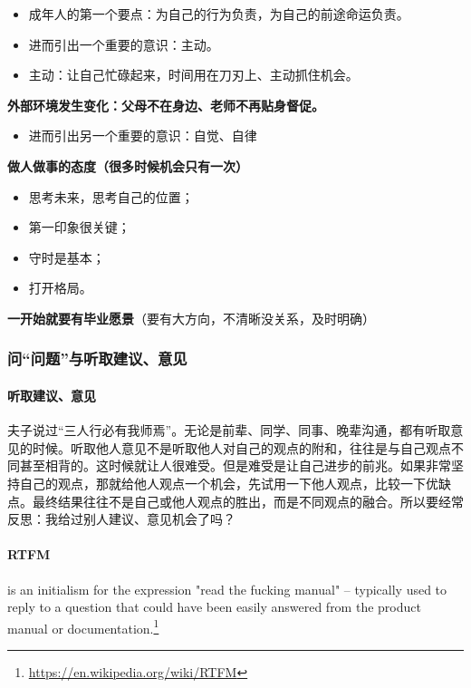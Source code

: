 \documentclass[cn,hazy,blue,14pt,screen]{elegantnote}
\begin{document}
\begin{itemize}
\item  成年人的第一个要点：为自己的行为负责，为自己的前途命运负责。

\item  进而引出一个重要的意识：主动。

\item  主动：让自己忙碌起来，时间用在刀刃上、主动抓住机会。
\end{itemize}


{\bf 外部环境发生变化：父母不在身边、老师不再贴身督促。}
\begin{itemize}
\item  进而引出另一个重要的意识：自觉、自律
\end{itemize}

 
 {\bf 做人做事的态度（很多时候机会只有一次）}
 \begin{itemize}
\item 思考未来，思考自己的位置；
 
\item 第一印象很关键；

\item 守时是基本；

\item 打开格局。
\end{itemize}
 
 {\bf 一开始就要有毕业愿景}（要有大方向，不清晰没关系，及时明确）
 
 
 
 
 \newpage
 \subsubsection{问“问题”与听取建议、意见}
\paragraph{听取建议、意见}
夫子说过“三人行必有我师焉”。无论是前辈、同学、同事、晚辈沟通，都有听取意见的时候。听取他人意见不是听取他人对自己的观点的附和，往往是与自己观点不同甚至相背的。这时候就让人很难受。但是难受是让自己进步的前兆。如果非常坚持自己的观点，那就给他人观点一个机会，先试用一下他人观点，比较一下优缺点。最终结果往往不是自己或他人观点的胜出，而是不同观点的融合。所以要经常反思：我给过别人建议、意见机会了吗？

\paragraph{RTFM} is an initialism for the expression "read the fucking manual" – typically used to reply to a question that could have been easily answered from the product manual or documentation.\footnote{\url{https://en.wikipedia.org/wiki/RTFM}}
\end{document}
